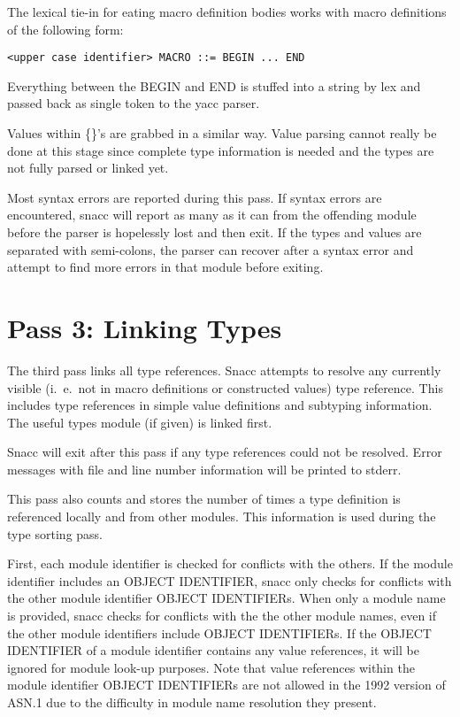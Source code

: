 The lexical tie-in for eating macro definition bodies works with macro
definitions of the following form:

\begin{verbatim}
<upper case identifier> MACRO ::= BEGIN ... END
\end{verbatim}

Everything between the {\ASN BEGIN} and {\ASN END} is stuffed into a
string by {\ufn lex} and passed back as single token to the
{\ufn yacc} parser.

Values within \{\}'s are grabbed in a similar way.  Value parsing
cannot really be done at this stage since complete type information is
needed and the types are not fully parsed or linked yet.

Most syntax errors are reported during this pass.  If syntax errors
are encountered, snacc will report as many as it can from the
offending module before the parser is hopelessly lost and then exit.
If the types and values are separated with semi-colons, the parser can
recover after a syntax error and attempt to find more errors in that
module before exiting.


\section{\label{comp-pass3-section}Pass 3: Linking Types}
The third pass links all type references.  Snacc attempts to resolve
any currently visible (i.\ e.\  not in macro definitions or constructed
values) type reference.  This includes type references in simple value
definitions and subtyping information.  The useful types module (if
given) is linked first.

Snacc will exit after this pass if any type references could not be
resolved.  Error messages with file and line number information will
be printed to {\C stderr}.

This pass also counts and stores the number of times a type definition is
referenced locally and from other modules.  This information is used
during the type sorting pass.

First, each module identifier is checked for conflicts with the
others.  If the module identifier includes an OBJECT IDENTIFIER, snacc
only checks for conflicts with the other module identifier OBJECT
IDENTIFIERs.  When only a module name is provided, snacc checks for
conflicts with the the other module names, even if the other module
identifiers include OBJECT IDENTIFIERs.  If the OBJECT IDENTIFIER of
a module identifier contains any value references, it will be ignored
for module look-up purposes.  Note that value references within the
module identifier OBJECT IDENTIFIERs are not allowed in the 1992
version of ASN.1 due to the difficulty in module name resolution they
present.

